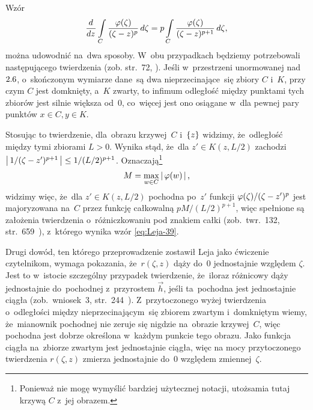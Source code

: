 \documentclass[a4paper,11pt]{article}
\begin{document}
\vspace{\spaceFour}


\start {} Wzór
\begin{equation}
  \label{eq:Leja-39}
  \frac{ d^{   } {   } }{ d {  z  }^{   } } \int\limits_{ C } \frac{ \varphi( \zeta ) }{ ( \zeta - z )^{ p } }\,
  d\zeta
  = p \int\limits_{ C } \frac{ \varphi( \zeta ) }{ ( \zeta - z )^{ p + 1 } }\, d\zeta,
\end{equation}
można udowodnić na~dwa sposoby. W~obu przypadkach będziemy
potrzebowali następującego twierdzenia (zob. str.~72,
\cite{SchwartzKursAnalizyMatematycznejTomI1979}). Jeśli w~przestrzeni
unormowanej nad~$2.6$, o~skończonym wymiarze dane~są dwa
nieprzecinające~się zbiory $C$ i~$K$, przy czym $C$ jest domknięty,
a~$K$ zwarty, to infimum odległość między punktami tych zbiorów jest
silnie większa od~$0$, co~więcej jest ono osiągane w~dla pewnej pary
punktów $x \in C, y \in K$.

Stosując to twierdzenie, dla~obrazu krzywej~$C$ i~$\{  z  \}$ widzimy,
że~odległość między tymi zbiorami $L > 0$. Wynika stąd, że~dla
$z' \in K( z, L / 2 )$ zachodzi
$\left| \,  1 / ( \zeta - z' )^{ p + 1 }  \, \right| \leq 1 / ( L / 2 )^{ p + 1 }$.
Oznaczają\footnote{Ponieważ nie mogę wymyślić bardziej użytecznej
  notacji, utożsamia tutaj krzywą $C$ z~jej obrazem.}
\begin{equation}
  \label{eq:Leja-40}
  M = \max_{ w \in C } \left| \,  \varphi( w )  \, \right|,
\end{equation}
widzimy więc, że~dla $z' \in K( z, L / 2 )$ pochodna po~$z'$ funkcji
$\varphi( \zeta ) / ( \zeta - z' )^{ p }$ jest majoryzowana na~$C$ przez
funkcję całkowalną $p M / ( L / 2 )^{ p + 1 }$, więc spełnione są
założenia twierdzenia o~różniczkowaniu pod znakiem całki
(zob.~twr.~132,
str.~659~\cite{SchwartzKursAnalizyMatematycznejTomI1979}), z~którego
wynika wzór \eqref{eq:Leja-39}.

Drugi dowód, ten którego przeprowadzenie zostawił Leja jako ćwiczenie
czytelnikom, wymaga pokazania, że~$r( \zeta, z )$ dąży do~$0$
jednostajnie względem $\zeta$. Jest to w~istocie szczególny przypadek
twierdzenie, że~iloraz różnicowy dąży jednostajnie do~pochodnej
z~przyrostem $\vec{ h }$, jeśli ta~pochodna jest jednostajnie ciągła
(zob.~wniosek~3,
str.~244~\cite{SchwartzKursAnalizyMatematycznejTomI1979}).
Z~przytoczonego wyżej twierdzenia o~odległości między
nieprzecinającym~się zbiorem zwartym i~domkniętym wiemy, że~mianownik
pochodnej nie zeruje się nigdzie na~obrazie krzywej~$C$, więc pochodna
jest dobrze określona w~każdym punkcie tego obrazu. Jako funkcja
ciągła na~zbiorze zwartym jest jednostajnie ciągła, więc na mocy
przytoczonego twierdzenia $r( \zeta, z )$ zmierza jednostajnie do~$0$
względem zmiennej~$\zeta$.
\end{document}
